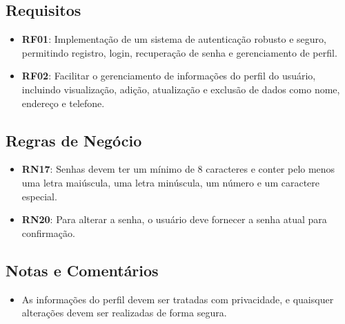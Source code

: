 \subsection*{Requisitos}
\begin{addmargin}[1.5cm]{0cm}
	\begin{itemize}
		\item \textbf{RF01}: Implementação de um sistema de autenticação robusto e seguro, permitindo registro, login, recuperação de senha e gerenciamento de perfil.
        \item \textbf{RF02}: Facilitar o gerenciamento de informações do perfil do usuário, incluindo visualização, adição, atualização e exclusão de dados como nome, endereço e telefone.
	\end{itemize}
\end{addmargin}

\subsection*{Regras de Negócio}
\begin{addmargin}[1.5cm]{0cm}
    \begin{itemize}
        \item \textbf{RN17}: Senhas devem ter um mínimo de 8 caracteres e conter pelo menos uma letra maiúscula, uma letra minúscula, um número e um caractere especial.
        \item \textbf{RN20}: Para alterar a senha, o usuário deve fornecer a senha atual para confirmação.
    \end{itemize}
\end{addmargin}

\subsection*{Notas e Comentários}
\begin{addmargin}[1.5cm]{0cm}
    \begin{itemize}
        \item As informações do perfil devem ser tratadas com privacidade, e quaisquer alterações devem ser realizadas de forma segura.
    \end{itemize}
\end{addmargin}
